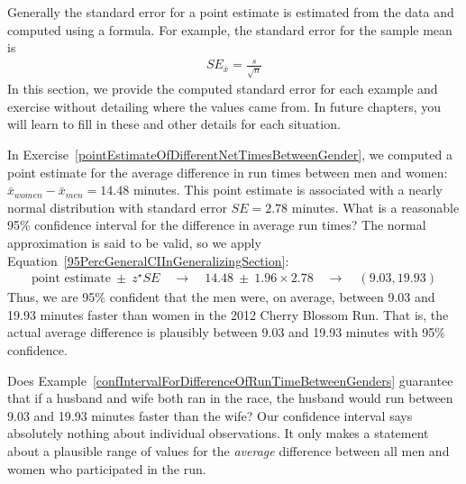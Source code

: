 Generally the standard error for a point estimate is estimated from the data and computed using a formula. For example, the standard error for the sample mean is
\begin{eqnarray*}
SE_{\bar{x}} = \frac{s}{\sqrt{n}}
\end{eqnarray*}
In this section, we provide the computed standard error for each example and exercise without detailing where the values came from. In future chapters, you will learn to fill in these and other details for each situation.

\begin{example}{In Exercise~\vref{pointEstimateOfDifferentNetTimesBetweenGender}, we computed a point estimate for the average difference in run times between men and women: $\bar{x}_{women}-\bar{x}_{men}=14.48$ minutes. This point estimate is associated with a nearly normal distribution with standard error $SE=2.78$ minutes. What is a reasonable 95\% confidence interval for the difference in average run times?}
\label{confIntervalForDifferenceOfRunTimeBetweenGenders}
The normal approximation is said to be valid, so we apply Equation~\eqref{95PercGeneralCIInGeneralizingSection}:
\begin{eqnarray*}
\text{point estimate}\ \pm\ z^{\star} SE
	\quad\rightarrow\quad 14.48\ \pm\ 1.96\times 2.78
	\quad\rightarrow\quad (9.03, 19.93)
\end{eqnarray*}
Thus, we are 95\% confident that the men were, on average, between 9.03 and 19.93 minutes faster than women in the 2012 Cherry Blossom Run. That is, the actual average difference is plausibly between 9.03 and 19.93 minutes with 95\% confidence.
\end{example}


\begin{example}{Does Example~\ref{confIntervalForDifferenceOfRunTimeBetweenGenders} guarantee that if a husband and wife both ran in the race, the husband would run between 9.03 and 19.93 minutes faster than the wife?}
Our confidence interval says absolutely nothing about individual observations. It {only} makes a statement about a plausible range of values for the \emph{average} difference between all men and women who participated in the run.
\end{example}

